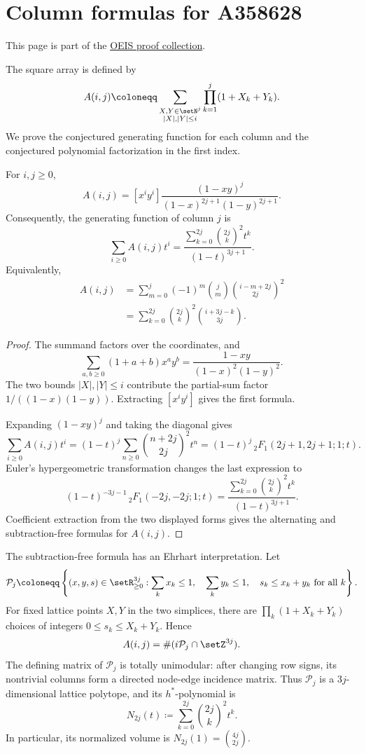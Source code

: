 

\section[oeisProofA358628]{Column formulas for A358628}

This page is part of the \hyperref[oeisProofs]{OEIS proof collection}.

The square array  is defined by
\[
A(i,j)\coloneqq
\sum_{\substack{X,Y\in\setN^j\\ |X|,|Y|\leq i}}
\prod_{k=1}^j(1+X_k+Y_k).
\]
We prove the conjectured generating function for each column and the
conjectured polynomial factorization in the first index.

\begin{theorem}
For $i,j\geq0$,
\[
A(i,j)=[x^iy^i]\frac{(1-xy)^j}
{(1-x)^{2j+1}(1-y)^{2j+1}}.
\]
Consequently, the generating function of column $j$ is
\[
\sum_{i\geq0}A(i,j)t^i
=\frac{\displaystyle\sum_{k=0}^{2j}\binom{2j}{k}^2t^k}
{(1-t)^{3j+1}}.
\]
Equivalently,
\[
\begin{aligned}
A(i,j)
&=\sum_{m=0}^j(-1)^m\binom jm
  \binom{i-m+2j}{2j}^2\\
&=\sum_{k=0}^{2j}\binom{2j}{k}^2
  \binom{i+3j-k}{3j}.
\end{aligned}
\]
\end{theorem}

\begin{proof}
The summand factors over the coordinates, and
\[
\sum_{a,b\geq0}(1+a+b)x^ay^b
=\frac{1-xy}{(1-x)^2(1-y)^2}.
\]
The two bounds $|X|,|Y|\leq i$ contribute the partial-sum factor
$1/((1-x)(1-y))$.  Extracting $[x^iy^i]$ gives the first formula.

Expanding $(1-xy)^j$ and taking the diagonal gives
\[
\sum_{i\geq0}A(i,j)t^i
=(1-t)^j\sum_{n\geq0}\binom{n+2j}{2j}^2t^n
=(1-t)^j\,{}_2F_1(2j+1,2j+1;1;t).
\]
Euler's hypergeometric transformation changes the last expression to
\[
(1-t)^{-3j-1}\,{}_2F_1(-2j,-2j;1;t)
=\frac{\sum_{k=0}^{2j}\binom{2j}{k}^2t^k}
{(1-t)^{3j+1}}.
\]
Coefficient extraction from the two displayed forms gives the alternating
and subtraction-free formulas for $A(i,j)$.
\end{proof}

The subtraction-free formula has an Ehrhart interpretation.  Let
\[
\mathcal P_j\coloneqq
\left\{(x,y,s)\in\setR_{\geq0}^{3j}:
\sum_kx_k\leq1,\quad \sum_ky_k\leq1,\quad
s_k\leq x_k+y_k\text{ for all }k\right\}.
\]
For fixed lattice points $X,Y$ in the two simplices, there are
$\prod_k(1+X_k+Y_k)$ choices of integers
$0\leq s_k\leq X_k+Y_k$.  Hence
\[
A(i,j)=\#(i\mathcal P_j\cap\setZ^{3j}).
\]
The defining matrix of $\mathcal P_j$ is totally unimodular: after changing
row signs, its nontrivial columns form a directed node-edge incidence matrix.
Thus $\mathcal P_j$ is a $3j$-dimensional lattice polytope, and its
$h^*$-polynomial is
\[
N_{2j}(t)\coloneqq\sum_{k=0}^{2j}\binom{2j}{k}^2t^k.
\]
In particular, its normalized volume is
$N_{2j}(1)=\binom{4j}{2j}$.

